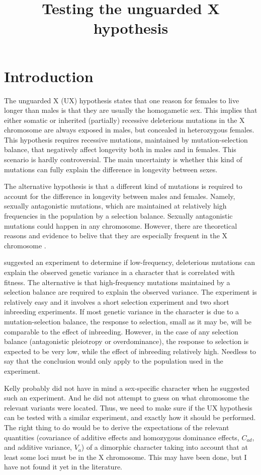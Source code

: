 \documentclass[a4paper,12pt]{article}
\title{Testing the unguarded X hypothesis}
\begin{document}
\maketitle
\section{Introduction}
The unguarded X (UX) hypothesis states that one reason for females to live longer than males is that they are usually the homogametic sex. This implies that either somatic or inherited (partially) recessive deleterious mutations in the X chromosome are always exposed in males, but concealed in heterozygous females. This hypothesis requires recessive mutations, maintained by mutation-selection balance, that negatively affect longevity both in males and in females. This scenario is hardly controversial. The main uncertainty is whether this kind of mutations can fully explain the difference in longevity between sexes.

The alternative hypothesis is that a different kind of mutations is required to account for the difference in longevity between males and females. Namely, sexually antagonistic mutations, which are maintained at relatively high frequencies in the population by a selection balance. Sexually antagonistic mutations could happen in any chromosome. However, there are theoretical reasons and evidence to belive that they are especially frequent in the X chromosome \citep{Gibson2002}.

\citet{Kelly1999} suggested an experiment to determine if low-frequency, deleterious mutations can explain the observed genetic variance in a character that is correlated with fitness. The alternative is that high-frequency mutations maintained by a selection balance are required to explain the observed variance. The experiment is relatively easy and it involves a short selection experiment and two short inbreeding experiments. If most genetic variance in the character is due to a mutation-selection balance, the response to selection, small as it may be, will be comparable to the effect of inbreeding. However, in the case of any selection balance (antagonistic pleiotropy or overdominance), the response to selection is expected to be very low, while the effect of inbreeding relatively high. Needless to say that the conclusion would only apply to the population used in the experiment.

Kelly probably did not have in mind a sex-specific character when he suggested such an experiment. And he did not attempt to guess on what chromosome the relevant variants were located. Thus, we need to make sure if the UX hypothesis can be tested with a similar experiment, and exactly how it should be performed. The right thing to do would be to derive the expectations of the relevant quantities (covariance of additive effects and homozygous dominance effects, $C_{ad}$, and additive variance, $V_a$) of a dimorphic character taking into account that at least some loci must be in the X chromosome. This may have been done, but I have not found it yet in the literature.
\end{document}
